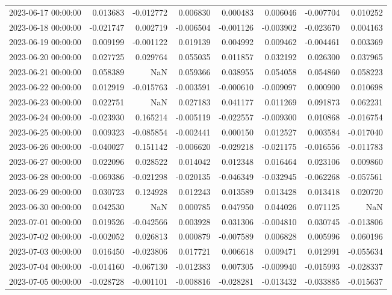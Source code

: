 \begin{tabular}{lrrrrrrr}
2023-06-17 00:00:00 & 0.013683 & -0.012772 & 0.006830 & 0.000483 & 0.006046 & -0.007704 & 0.010252 \\
2023-06-18 00:00:00 & -0.021747 & 0.002719 & -0.006504 & -0.001126 & -0.003902 & -0.023670 & 0.004163 \\
2023-06-19 00:00:00 & 0.009199 & -0.001122 & 0.019139 & 0.004992 & 0.009462 & -0.004461 & 0.003369 \\
2023-06-20 00:00:00 & 0.027725 & 0.029764 & 0.055035 & 0.011857 & 0.032192 & 0.026300 & 0.037965 \\
2023-06-21 00:00:00 & 0.058389 & NaN & 0.059366 & 0.038955 & 0.054058 & 0.054860 & 0.058223 \\
2023-06-22 00:00:00 & 0.012919 & -0.015763 & -0.003591 & -0.000610 & -0.009097 & 0.000900 & 0.010698 \\
2023-06-23 00:00:00 & 0.022751 & NaN & 0.027183 & 0.041177 & 0.011269 & 0.091873 & 0.062231 \\
2023-06-24 00:00:00 & -0.023930 & 0.165214 & -0.005119 & -0.022557 & -0.009300 & 0.010868 & -0.016754 \\
2023-06-25 00:00:00 & 0.009323 & -0.085854 & -0.002441 & 0.000150 & 0.012527 & 0.003584 & -0.017040 \\
2023-06-26 00:00:00 & -0.040027 & 0.151142 & -0.006620 & -0.029218 & -0.021175 & -0.016556 & -0.011783 \\
2023-06-27 00:00:00 & 0.022096 & 0.028522 & 0.014042 & 0.012348 & 0.016464 & 0.023106 & 0.009860 \\
2023-06-28 00:00:00 & -0.069386 & -0.021298 & -0.020135 & -0.046349 & -0.032945 & -0.062268 & -0.057561 \\
2023-06-29 00:00:00 & 0.030723 & 0.124928 & 0.012243 & 0.013589 & 0.013428 & 0.013418 & 0.020720 \\
2023-06-30 00:00:00 & 0.042530 & NaN & 0.000785 & 0.047950 & 0.044026 & 0.071125 & NaN \\
2023-07-01 00:00:00 & 0.019526 & -0.042566 & 0.003928 & 0.031306 & -0.004810 & 0.030745 & -0.013806 \\
2023-07-02 00:00:00 & -0.002052 & 0.026813 & 0.000879 & -0.007589 & 0.006828 & 0.005996 & 0.060196 \\
2023-07-03 00:00:00 & 0.016450 & -0.023806 & 0.017721 & 0.006618 & 0.009471 & 0.012991 & -0.055634 \\
2023-07-04 00:00:00 & -0.014160 & -0.067130 & -0.012383 & 0.007305 & -0.009940 & -0.015993 & -0.028337 \\
2023-07-05 00:00:00 & -0.028728 & -0.001101 & -0.008816 & -0.028281 & -0.013432 & -0.033885 & -0.015637 \\

\end{tabular}
